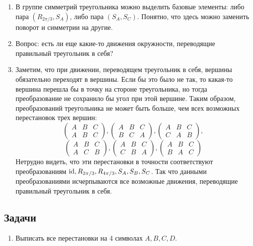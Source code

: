 \begin{enumerate}
\item В группе симметрий треугольника можно выделить базовые элементы: либо пара $(R_{2\pi/3}, S_A)$, либо пара $(S_A,S_C)$. Понятно, что здесь можно заменить поворот и симметрии на другие.
\item Вопрос: есть ли еще какие-то движения окружности, переводящие правильный треугольник в себя?
\item Заметим, что при движении, переводящем треугольник в себя, вершины обязательно переходят в вершины. Если бы это было не так, то какая-то вершина перешла бы в точку на стороне треугольника, но тогда преобразование не сохранило бы угол при этой вершине. Таким образом, преобразований треугольника не может быть больше, чем всех возможных перестановок трех вершин:
$$
\begin{pmatrix}
A & B & C \\
A & B & C
\end{pmatrix},
\begin{pmatrix}
A & B & C \\
B & C & A
\end{pmatrix},
\begin{pmatrix}
A & B & C \\
C & A & B
\end{pmatrix},
$$
$$
\begin{pmatrix}
A & B & C \\
A & C & B
\end{pmatrix},
\begin{pmatrix}
A & B & C \\
C & B & A
\end{pmatrix},
\begin{pmatrix}
A & B & C \\
B & A & C
\end{pmatrix}
$$
Нетрудно видеть, что эти перестановки в точности соответствуют преобразованиям $\mathrm{id}, R_{2\pi/3}, R_{4\pi/3}, S_A, S_B, S_C$. Так что данными преобразованиями исчерпываются все возможные движения, переводящие правильный треугольник в себя.
\end{enumerate}
\subsection{Задачи}
\begin{enumerate}
\item Выписать все перестановки на 4 символах $A,B,C,D$.
\end{enumerate}



